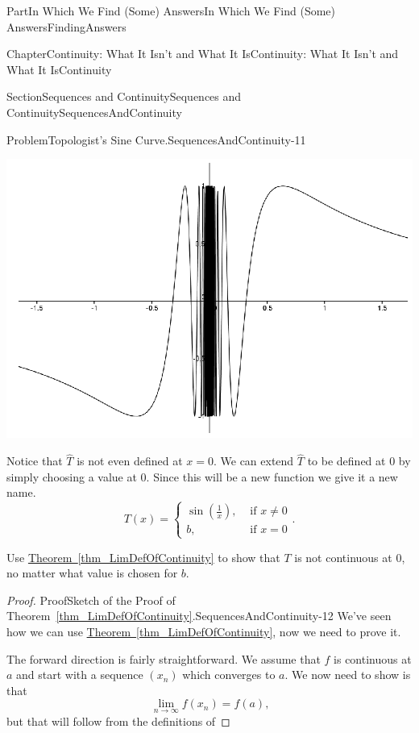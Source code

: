 \documentclass[oneside,10pt,]{book}
\newcommand{\xreffont}{\relax}
\numberwithin{equation}{part}
\def\limit#1#2#3{{\displaystyle\lim_{#1\rightarrow #2}#3}}
\newcommand{\amp}{&}
\begin{document}
\begin{partptx}{Part}{In Which We Find (Some) Answers}{}{In Which We Find (Some) Answers}{}{}{FindingAnswers}
\begin{chapterptx}{Chapter}{Continuity: What It Isn't and What It Is}{}{Continuity: What It Isn't and What It Is}{}{}{Continuity}
\begin{sectionptx}{Section}{Sequences and Continuity}{}{Sequences and Continuity}{}{}{SequencesAndContinuity}
\begin{problem}{Problem}{Topologist's Sine Curve.}{SequencesAndContinuity-11}
\begin{image}{0.125}{0.75}{0.125}{}%
\includegraphics[width=\linewidth]{external/images/Ch5fig7.png}
\end{image}%
Notice that \(\hat{T}\) is not even defined at \(x=0\). We can extend \(\hat{T}\) to be defined at \(0\) by simply choosing a value at  \(0\). Since this will be a new function we give it a new name.%
\begin{equation*}
T(x)= \begin{cases}
\sin\left(\frac{1}{x}\right),\amp \text{ if } x\neq 0\\ 
b,\amp \text{ if } x=0 \end{cases} \text{.}
\end{equation*}
%
\par
Use \hyperref[thm_LimDefOfContinuity]{Theorem~{\xreffont\ref{thm_LimDefOfContinuity}}} to show that \(T\) is not continuous at \(0\), no matter what value is chosen for \(b\).%
\end{problem}
\begin{proof}{Proof}{Sketch of the Proof of Theorem~{\xreffont\ref*{thm_LimDefOfContinuity}}.}{SequencesAndContinuity-12}
We've seen how we can use \hyperref[thm_LimDefOfContinuity]{Theorem~{\xreffont\ref{thm_LimDefOfContinuity}}}, now we need to prove it.%
\par
The forward direction is fairly straightforward.  We assume that \(f\) is continuous at \(a\) and start with a sequence \(\left(x_n\right)\) which converges to \(a\). We now need  to show is that%
\begin{equation*}
\limit{n}{\infty}{f(x_n)}=f(a)\text{,}
\end{equation*}
but that will follow from the definitions of%

\end{proof}
\end{sectionptx}
\end{chapterptx}
\end{partptx}
\end{document}
